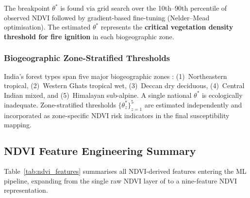 \documentclass[12pt, a4paper]{article}
\begin{document}
The breakpoint $\theta^{*}$ is found via grid search over the
10th--90th percentile of observed NDVI followed by gradient-based
fine-tuning (Nelder--Mead optimisation). The estimated $\theta^{*}$
represents the \textbf{critical vegetation density threshold for fire
ignition} in each biogeographic zone.

\subsubsection{Biogeographic Zone-Stratified Thresholds}
\label{sec:zone_thresh}

India's forest types span five major biogeographic zones
\citep{rodgers1988}: (1)~Northeastern tropical, (2)~Western Ghats
tropical wet, (3)~Deccan dry deciduous, (4)~Central Indian mixed, and
(5)~Himalayan sub-alpine. A single national $\theta^{*}$ is
ecologically inadequate. Zone-stratified thresholds $\{\theta^{*}_{z}\}_{z=1}^{5}$
are estimated independently and incorporated as zone-specific NDVI
risk indicators in the final susceptibility mapping.

\subsection{NDVI Feature Engineering Summary}
\label{sec:ndvi_features}

Table~\ref{tab:ndvi_features} summarises all NDVI-derived features
entering the ML pipeline, expanding from the single raw NDVI layer
of \citet{biswas2025} to a nine-feature NDVI representation.
\end{document}
